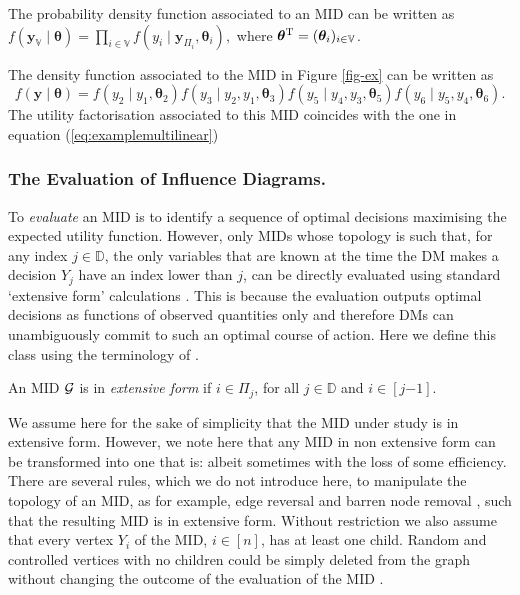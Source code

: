 \begin{proposition}
\label{lemma:id}
The probability density function associated to an MID can be written as
$
f(\bm{y}_{\mathbb{V}}\;|\;\bm{\theta})=\prod_{i\in{\mathbb{V}}}f(y_i\;|\;\bm{y}_{\Pi_i},\bm{\theta}_i),
$
where $\bm{\theta}^{\textnormal{T}}=(\bm{\theta}_i)_{i\in\mathbb{V}}$.
\end{proposition}

\begin{example}
The density function associated to the MID in Figure \ref{fig-ex} can be written as
\begin{equation*}
f(\bm{y}\;|\;\bm{\theta})=f(y_2\;|\;y_1,\bm{\theta}_2)f(y_3\;|\;y_2,y_1,\bm{\theta}_3)f(y_5\;|\;y_4,y_3,\bm{\theta}_5)f(y_6\;|\;y_5,y_4,\bm{\theta}_6).
\end{equation*}
The utility factorisation associated to this MID coincides with the one in equation (\ref{eq:examplemultilinear})
\end{example}
\subsubsection{The Evaluation of Influence Diagrams.} 
To \textit{evaluate} an MID is to identify a sequence of optimal decisions maximising the expected utility function. However, only  MIDs whose topology is such that, for any index $j\in\mathbb{D}$, the only variables that are known at the time the DM makes a decision $Y_j$  have an index lower than $j$, can be directly evaluated using standard \lq{e}xtensive form'   calculations \citep{Smith1989a}. This is because the evaluation outputs optimal decisions as functions of observed quantities only and therefore DMs can unambiguously commit to such an optimal course of action. Here we define this class using the terminology of \cite{Smith2010}.
\begin{definition}
\label{ei}
An MID $\mathcal{G}$  is in \emph{extensive form} if $i\in\Pi_j$, for all $j\in\mathbb{D}$ and $i\in[j{-1}]$. 
\end{definition}
We assume here for the sake of simplicity that the MID under study is in extensive form. However, we note here that any MID in non extensive form can be transformed into one that is: albeit sometimes with the loss of some efficiency. There are several rules, which we do not introduce here, to manipulate the topology of an MID, as for example, edge reversal and barren node removal \citep[see e.g.][]{Jensen2009,Shachter1986}, such that the resulting MID is in extensive form.  Without restriction we also assume that every vertex $Y_i$ of the MID, $i\in [n]$, has at least one child. Random and controlled vertices with no children could be simply deleted from the graph without changing the outcome of the evaluation of the MID \citep[see e.g.][]{Jensen2009}.  

